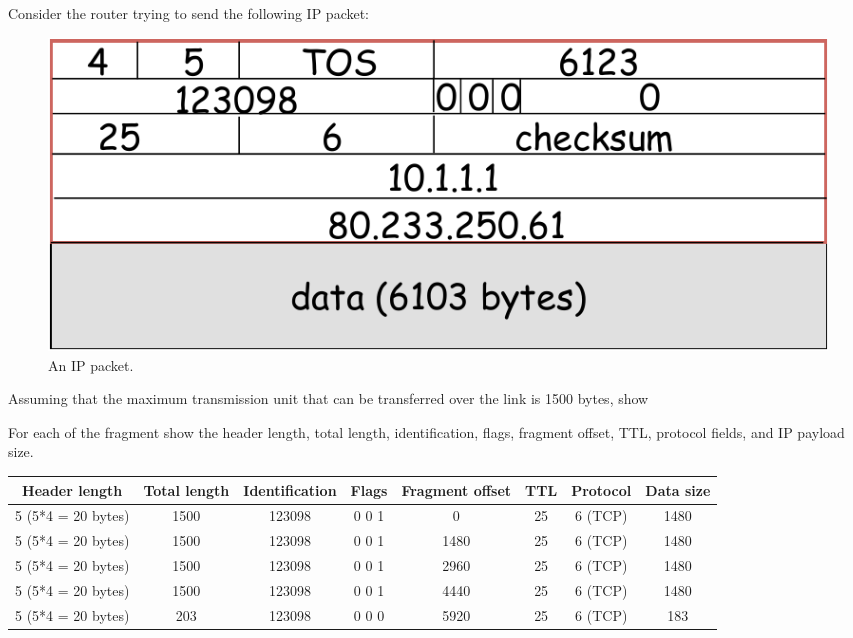\documentclass{report}
\begin{document}
\clearpage
\begin{problem}

Consider the router trying to send the following IP packet:

\begin{figure}[!h]
\center
\includegraphics[scale=0.8]{hw6-frag}
\caption{An IP packet.}
\label{fig:ip-frag}
\end{figure}

Assuming that the maximum transmission unit that can be transferred over the link is 1500 bytes, show

For each of the fragment show the header length, total length, identification, flags, fragment offset, TTL, protocol fields, and IP payload size.

\vspace{20px}

\begin{tabular}[h]{|c|c|c|c|c|c|c|c|}
  \hline
  Header length &
  Total length &
  Identification &
  Flags &
  Fragment offset &
  TTL &
  Protocol &
  Data size \\
  \hline
  5 (5*4 = 20 bytes) & 1500 & 123098 & 0 0 1 & 0    & 25 & 6 (TCP) & 1480 \\
  5 (5*4 = 20 bytes) & 1500 & 123098 & 0 0 1 & 1480 & 25 & 6 (TCP) & 1480 \\
  5 (5*4 = 20 bytes) & 1500 & 123098 & 0 0 1 & 2960 & 25 & 6 (TCP) & 1480 \\
  5 (5*4 = 20 bytes) & 1500 & 123098 & 0 0 1 & 4440 & 25 & 6 (TCP) & 1480 \\
  5 (5*4 = 20 bytes) & 203  & 123098 & 0 0 0 & 5920 & 25 & 6 (TCP) & 183  \\
  \hline
\end{tabular}


\end{problem}
\end{document}
